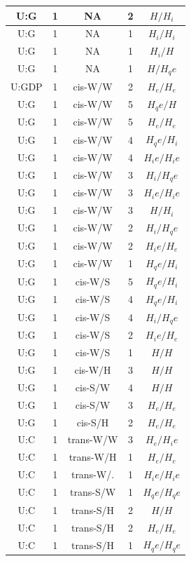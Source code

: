 \begin{center}
\begin{longtable}{c|c|c|c|c}
U:G & 1 & NA & 2 & $H/H_i$ \\  \hline
U:G & 1 & NA & 1 & $H_i/H_i$ \\  \hline
U:G & 1 & NA & 1 & $H_i/H$ \\  \hline
U:G & 1 & NA & 1 & $H/H_qe$ \\  \hline
U:GDP & 1 & cis-W/W & 2 & $H_e/H_e$ \\  \hline
U:G & 1 & cis-W/W & 5 & $H_qe/H$ \\  \hline
U:G & 1 & cis-W/W & 5 & $H_e/H_e$ \\  \hline
U:G & 1 & cis-W/W & 4 & $H_qe/H_i$ \\  \hline
U:G & 1 & cis-W/W & 4 & $H_ie/H_ie$ \\  \hline
U:G & 1 & cis-W/W & 3 & $H_i/H_qe$ \\  \hline
U:G & 1 & cis-W/W & 3 & $H_ie/H_ie$ \\  \hline
U:G & 1 & cis-W/W & 3 & $H/H_i$ \\  \hline
U:G & 1 & cis-W/W & 2 & $H_i/H_qe$ \\  \hline
U:G & 1 & cis-W/W & 2 & $H_ie/H_e$ \\  \hline
U:G & 1 & cis-W/W & 1 & $H_qe/H_i$ \\  \hline
U:G & 1 & cis-W/S & 5 & $H_qe/H_i$ \\  \hline
U:G & 1 & cis-W/S & 4 & $H_qe/H_i$ \\  \hline
U:G & 1 & cis-W/S & 4 & $H_i/H_qe$ \\  \hline
U:G & 1 & cis-W/S & 2 & $H_ie/H_e$ \\  \hline
U:G & 1 & cis-W/S & 1 & $H/H$ \\  \hline
U:G & 1 & cis-W/H & 3 & $H/H$ \\  \hline
U:G & 1 & cis-S/W & 4 & $H/H$ \\  \hline
U:G & 1 & cis-S/W & 3 & $H_e/H_e$ \\  \hline
U:G & 1 & cis-S/H & 2 & $H_e/H_e$ \\  \hline
U:C & 1 & trans-W/W & 3 & $H_e/H_ie$ \\  \hline
U:C & 1 & trans-W/H & 1 & $H_e/H_e$ \\  \hline
U:C & 1 & trans-W/. & 1 & $H_ie/H_ie$ \\  \hline
U:C & 1 & trans-S/W & 1 & $H_qe/H_qe$ \\  \hline
U:C & 1 & trans-S/H & 2 & $H/H$ \\  \hline
U:C & 1 & trans-S/H & 2 & $H_e/H_e$ \\  \hline
U:C & 1 & trans-S/H & 1 & $H_qe/H_qe$ \\  \hline

\end{longtable}
\end{center}
